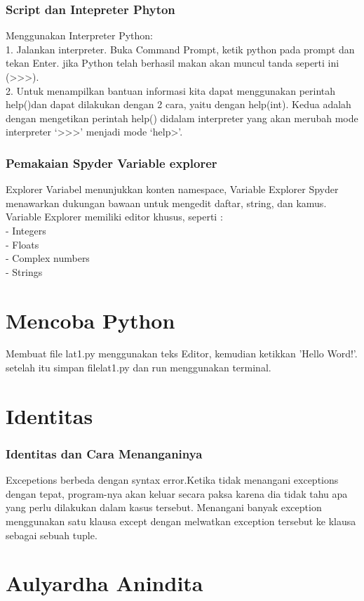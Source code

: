 \subsubsection{Script dan Intepreter Phyton}
Menggunakan Interpreter Python: \\
1. Jalankan interpreter. Buka Command Prompt, ketik python pada prompt dan tekan Enter. jika Python telah berhasil makan akan muncul tanda seperti ini (>>>).\\
2. Untuk menampilkan bantuan informasi kita dapat menggunakan perintah help()dan dapat dilakukan dengan 2 cara, yaitu dengan   help(int). Kedua adalah dengan mengetikan perintah help() didalam interpreter yang akan merubah mode interpreter ‘>>>’ menjadi mode ‘help>’.

\subsubsection{Pemakaian Spyder Variable explorer}
Explorer Variabel menunjukkan konten namespace, Variable Explorer Spyder menawarkan dukungan bawaan untuk mengedit daftar, string, dan kamus. Variable Explorer memiliki editor khusus, seperti :\\
- Integers\\
- Floats\\
- Complex numbers\\
- Strings
\section{Mencoba Python}
Membuat file lat1.py menggunakan teks Editor, kemudian ketikkan 'Hello Word!'. setelah itu simpan filelat1.py dan run menggunakan terminal.
\section{Identitas}
\subsubsection{Identitas dan Cara Menanganinya}
Excepetions berbeda dengan syntax error.Ketika tidak menangani exceptions dengan tepat, program-nya akan keluar secara paksa karena dia tidak tahu apa yang perlu dilakukan dalam kasus tersebut. Menangani banyak exception menggunakan satu klausa except dengan melwatkan exception tersebut ke klausa sebagai sebuah tuple.

\section{Aulyardha Anindita}
